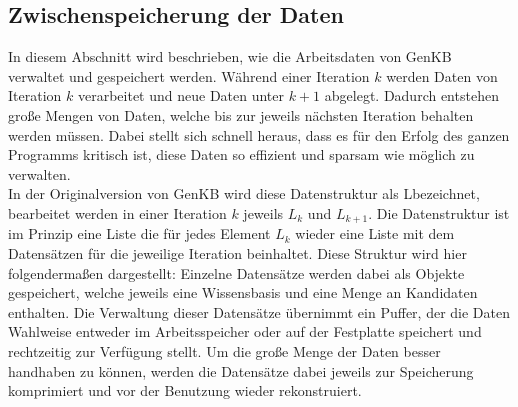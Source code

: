 \documentclass[12pt,a4paper]{article}
\begin{document}
\subsection{Zwischenspeicherung der Daten}
In diesem Abschnitt wird beschrieben, wie die Arbeitsdaten von GenKB verwaltet und gespeichert werden. Während einer Iteration $k$ werden Daten von Iteration $k$ verarbeitet und neue Daten unter $k + 1$ abgelegt. Dadurch entstehen große Mengen von Daten, welche bis zur jeweils nächsten Iteration behalten werden müssen. Dabei stellt sich schnell heraus, dass es für den Erfolg des ganzen Programms kritisch ist, diese Daten so effizient und sparsam wie möglich zu verwalten. \\
In der Originalversion von GenKB wird diese Datenstruktur als \glqq L\grqq \space bezeichnet, bearbeitet werden in einer Iteration $k$ jeweils $L_k$ und  $L_{k+1}$. Die Datenstruktur ist im Prinzip eine Liste die für jedes Element $L_k$ wieder eine Liste mit dem Datensätzen für die jeweilige Iteration beinhaltet. Diese Struktur wird hier folgendermaßen dargestellt: Einzelne Datensätze werden dabei als Objekte gespeichert, welche jeweils eine Wissensbasis und eine Menge an Kandidaten enthalten. Die Verwaltung dieser Datensätze übernimmt ein Puffer, der die Daten Wahlweise entweder im Arbeitsspeicher oder auf der Festplatte speichert und rechtzeitig zur Verfügung stellt. Um die große Menge der Daten besser handhaben zu können, werden die Datensätze dabei jeweils zur Speicherung komprimiert und vor der Benutzung wieder rekonstruiert.
\end{document}
